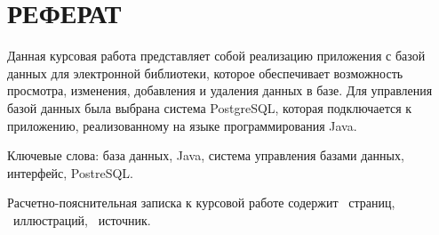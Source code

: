 \chapter*{РЕФЕРАТ}

Данная курсовая работа представляет собой реализацию приложения с базой данных для электронной библиотеки, которое обеспечивает возможность просмотра, изменения, добавления и удаления данных в базе. Для управления базой данных была выбрана система PostgreSQL, которая подключается к приложению, реализованному на языке программирования Java.

Ключевые слова: база данных, Java, система управления базами данных, интерфейс, PostreSQL.

Расчетно-пояснительная записка к курсовой работе содержит \pageref{LastPage}~страниц, \totfig~иллюстраций, \thetotbibentries~источник.